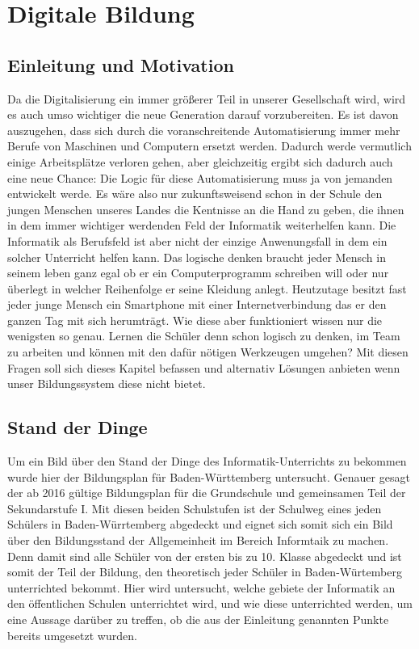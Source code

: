 \chapter{Digitale Bildung}

\section{Einleitung und Motivation}

Da die Digitalisierung ein immer größerer Teil in unserer Gesellschaft wird, wird es auch umso wichtiger die neue Generation darauf vorzubereiten. Es ist davon auszugehen, dass sich durch die voranschreitende Automatisierung immer mehr Berufe von Maschinen und Computern ersetzt werden. Dadurch werde vermutlich einige Arbeitsplätze verloren gehen, aber gleichzeitig ergibt sich dadurch auch eine neue Chance: Die Logic für diese Automatisierung muss ja von jemanden entwickelt werde. Es wäre also nur zukunftsweisend  schon in der Schule den jungen Menschen unseres Landes die Kentnisse an die Hand zu geben, die ihnen in dem immer wichtiger werdenden Feld der Informatik weiterhelfen kann.
Die Informatik als Berufsfeld ist aber nicht der einzige Anwenungsfall in dem ein solcher Unterricht helfen kann. Das logische denken braucht jeder Mensch in seinem leben ganz egal ob er ein Computerprogramm schreiben will oder nur überlegt in welcher Reihenfolge er seine Kleidung anlegt. Heutzutage besitzt fast jeder junge Mensch ein Smartphone mit einer Internetverbindung das er den ganzen Tag  mit sich herumträgt. Wie diese aber funktioniert wissen nur die wenigsten so genau. 
Lernen die Schüler denn schon logisch zu denken, im Team zu arbeiten und können mit den dafür nötigen Werkzeugen umgehen? Mit diesen Fragen soll sich dieses Kapitel befassen und alternativ Lösungen anbieten wenn unser Bildungssystem diese nicht bietet.


\section{Stand der Dinge}

Um ein Bild über den Stand der Dinge des Informatik-Unterrichts zu bekommen wurde hier der Bildungsplan für Baden-Württemberg untersucht. Genauer gesagt der ab 2016 gültige Bildungsplan für die Grundschule und gemeinsamen Teil der Sekundarstufe I. Mit diesen beiden Schulstufen ist der Schulweg eines jeden Schülers in Baden-Würrtemberg abgedeckt und eignet sich somit sich ein Bild über den Bildungsstand der Allgemeinheit im Bereich Informtaik zu machen. Denn damit sind alle Schüler von der ersten bis zu 10. Klasse abgedeckt und ist somit der Teil der Bildung, den theoretisch jeder Schüler in Baden-Würtemberg unterrichted bekommt. Hier wird untersucht, welche gebiete der Informatik an den öffentlichen Schulen unterrichtet wird, und wie diese unterrichted werden, um eine Aussage darüber zu treffen, ob die aus der Einleitung genannten Punkte bereits umgesetzt wurden.

